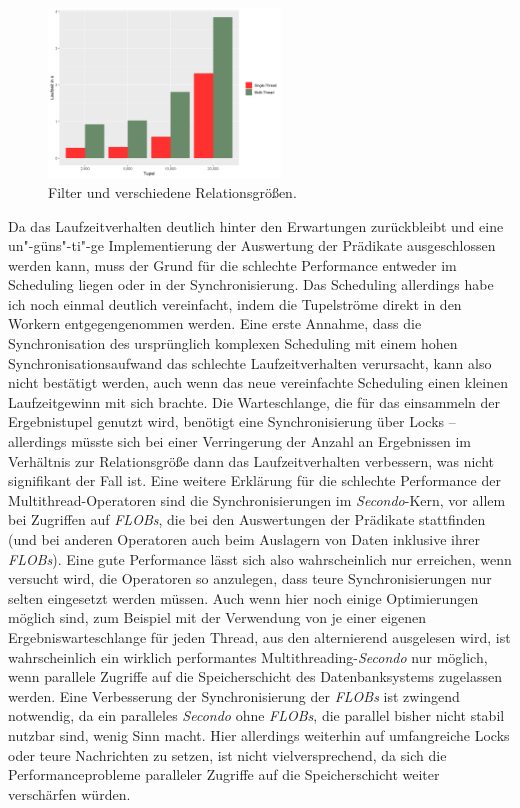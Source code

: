 \documentclass[a4paper,12pt,twoside]{article}
\newcommand{\Fb}[1]{\textit{#1}} %
\begin{document}
\begin{figure}
	\centering
	\includegraphics[width=0.55\textwidth]{Bilder/filter_head.png}
	\caption{Filter und verschiedene Relationsgrößen.}
	\label{img:filterHead}
\end{figure}

Da das Laufzeitverhalten deutlich hinter den Erwartungen zurückbleibt und eine un"-güns"-ti"-ge Implementierung der Auswertung der Prädikate ausgeschlossen werden kann, muss der Grund für die schlechte Performance entweder im Scheduling liegen oder in der Synchronisierung. Das Scheduling allerdings habe ich noch einmal deutlich vereinfacht, indem die Tupelströme direkt in den Workern entgegengenommen werden. Eine erste Annahme, dass die Synchronisation des ursprünglich komplexen Scheduling mit einem hohen Synchronisationsaufwand das schlechte Laufzeitverhalten verursacht, kann also nicht bestätigt werden, auch wenn das neue vereinfachte Scheduling einen kleinen Laufzeitgewinn mit sich brachte. Die Warteschlange, die für das einsammeln der Ergebnistupel genutzt wird, benötigt eine Synchronisierung über Locks -- allerdings müsste sich bei einer Verringerung der Anzahl an Ergebnissen im Verhältnis zur Relationsgröße dann das Laufzeitverhalten verbessern, was nicht signifikant der Fall ist. Eine weitere Erklärung für die schlechte Performance der Multithread-Operatoren sind die Synchronisierungen im \Fb{Secondo}-Kern, vor allem bei Zugriffen auf \Fb{FLOBs}, die bei den Auswertungen der Prädikate stattfinden (und bei anderen Operatoren auch beim Auslagern von Daten inklusive ihrer \Fb{FLOBs}). Eine gute Performance lässt sich also wahrscheinlich nur erreichen, wenn versucht wird, die Operatoren so anzulegen, dass teure Synchronisierungen nur selten eingesetzt werden müssen. Auch wenn hier noch einige Optimierungen möglich sind, zum Beispiel mit der Verwendung von je einer eigenen Ergebniswarteschlange für jeden Thread, aus den alternierend ausgelesen wird, ist wahrscheinlich ein wirklich performantes Multithreading-\Fb{Secondo} nur möglich, wenn parallele Zugriffe auf die Speicherschicht des Datenbanksystems zugelassen werden. Eine Verbesserung der Synchronisierung der \Fb{FLOBs} ist zwingend notwendig, da ein paralleles \Fb{Secondo} ohne \Fb{FLOBs}, die parallel bisher nicht stabil nutzbar sind, wenig Sinn macht. Hier allerdings weiterhin auf umfangreiche Locks oder teure Nachrichten zu setzen, ist nicht vielversprechend, da sich die Performanceprobleme paralleler Zugriffe auf die Speicherschicht weiter verschärfen würden. 
\end{document}
